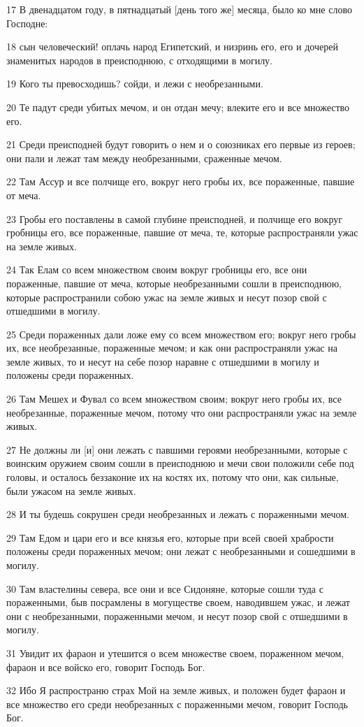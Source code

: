 \par 17 В двенадцатом году, в пятнадцатый [день того же] месяца, было ко мне слово Господне:
\par 18 сын человеческий! оплачь народ Египетский, и низринь его, его и дочерей знаменитых народов в преисподнюю, с отходящими в могилу.
\par 19 Кого ты превосходишь? сойди, и лежи с необрезанными.
\par 20 Те падут среди убитых мечом, и он отдан мечу; влеките его и все множество его.
\par 21 Среди преисподней будут говорить о нем и о союзниках его первые из героев; они пали и лежат там между необрезанными, сраженные мечом.
\par 22 Там Ассур и все полчище его, вокруг него гробы их, все пораженные, павшие от меча.
\par 23 Гробы его поставлены в самой глубине преисподней, и полчище его вокруг гробницы его, все пораженные, павшие от меча, те, которые распространяли ужас на земле живых.
\par 24 Так Елам со всем множеством своим вокруг гробницы его, все они пораженные, павшие от меча, которые необрезанными сошли в преисподнюю, которые распространили собою ужас на земле живых и несут позор свой с отшедшими в могилу.
\par 25 Среди пораженных дали ложе ему со всем множеством его; вокруг него гробы их, все необрезанные, пораженные мечом; и как они распространяли ужас на земле живых, то и несут на себе позор наравне с отшедшими в могилу и положены среди пораженных.
\par 26 Там Мешех и Фувал со всем множеством своим; вокруг него гробы их, все необрезанные, пораженные мечом, потому что они распространяли ужас на земле живых.
\par 27 Не должны ли [и] они лежать с павшими героями необрезанными, которые с воинским оружием своим сошли в преисподнюю и мечи свои положили себе под головы, и осталось беззаконие их на костях их, потому что они, как сильные, были ужасом на земле живых.
\par 28 И ты будешь сокрушен среди необрезанных и лежать с пораженными мечом.
\par 29 Там Едом и цари его и все князья его, которые при всей своей храбрости положены среди пораженных мечом; они лежат с необрезанными и сошедшими в могилу.
\par 30 Там властелины севера, все они и все Сидоняне, которые сошли туда с пораженными, быв посрамлены в могуществе своем, наводившем ужас, и лежат они с необрезанными, пораженными мечом, и несут позор свой с отшедшими в могилу.
\par 31 Увидит их фараон и утешится о всем множестве своем, пораженном мечом, фараон и все войско его, говорит Господь Бог.
\par 32 Ибо Я распространю страх Мой на земле живых, и положен будет фараон и все множество его среди необрезанных с пораженными мечом, говорит Господь Бог.

